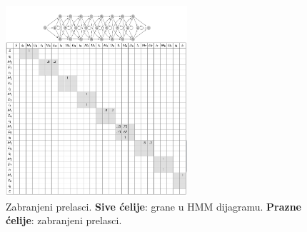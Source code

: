 \begin{figure}[h]
\centering
\includegraphics[width=0.6\textwidth]{poglavlja/10/slike/slika10.png}
\caption{Zabranjeni prelasci. \textbf{Sive ćelije}: grane u HMM dijagramu. \textbf{Prazne ćelije}: zabranjeni prelasci.}
\label{slika: 10}
\end{figure}

